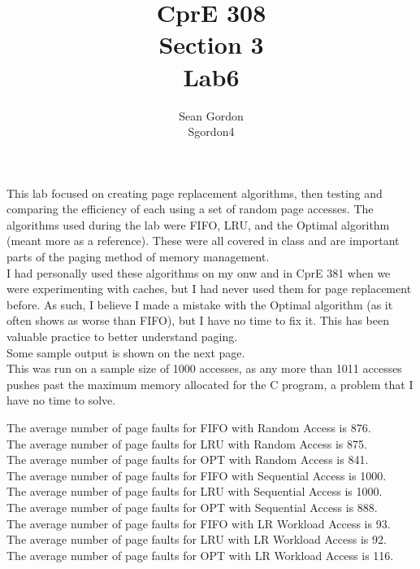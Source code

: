 \documentclass[12pt]{article}
\title{CprE 308\\Section 3\\Lab6}
\author{Sean Gordon\\Sgordon4}
\begin{document}
\maketitle

\noindent This lab focused on creating page replacement algorithms, then testing and comparing the efficiency of each using a set of random page accesses. The algorithms used during the lab were FIFO, LRU, and the Optimal algorithm (meant more as a reference). These were all covered in class and are important parts of the paging method of memory management.\\

\noindent I had personally used these algorithms on my onw and in CprE 381 when we were experimenting with caches, but I had never used them for page replacement before. As such, I believe I made a mistake with the Optimal algorithm (as it often shows as worse than FIFO), but I have no time to fix it. This has been valuable practice to better understand paging.\\

\noindent Some sample output is shown on the next page.\\
 This was run on a sample size of 1000 accesses, as any more than 1011 accesses pushes past the maximum memory allocated for the C program, a problem that I have no time to solve.\\
 
 
\pagebreak


\noindent
The average number of page faults for FIFO with Random Access is 876.\\
The average number of page faults for LRU with Random Access is 875.\\
The average number of page faults for OPT with Random Access is 841.\\

\noindent The average number of page faults for FIFO with Sequential Access is 1000.\\
The average number of page faults for LRU with Sequential Access is 1000.\\
The average number of page faults for OPT with Sequential Access is 888.\\

\noindent The average number of page faults for FIFO with LR Workload Access is 93.\\
The average number of page faults for LRU with LR Workload Access is 92.\\
The average number of page faults for OPT with LR Workload Access is 116.\\
\end{document}
